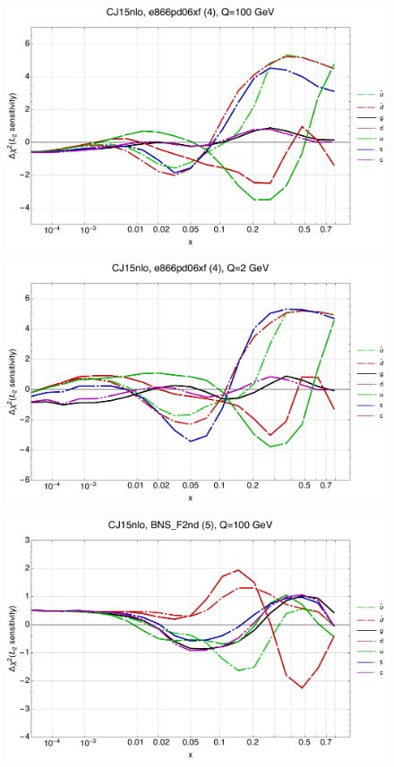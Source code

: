\documentclass[10pt,aps,prd,floatfix,titlepage]{revtex4}
\begin{document}
\clearpage
\begin{figure}
\includegraphics[width=\textwidth,height=0.44\textheight,keepaspectratio]{1/4_CJ15nlo_L2_q100_Sf_1.pdf}
\caption{}
\end{figure}
\begin{figure}
\includegraphics[width=\textwidth,height=0.44\textheight,keepaspectratio]{1/4_CJ15nlo_L2_q2_Sf_1.pdf}
\caption{}
\end{figure}
\clearpage
\begin{figure}
\includegraphics[width=\textwidth,height=0.44\textheight,keepaspectratio]{1/5_CJ15nlo_L2_q100_Sf_1.pdf}
\caption{}
\end{figure}
\end{document}
